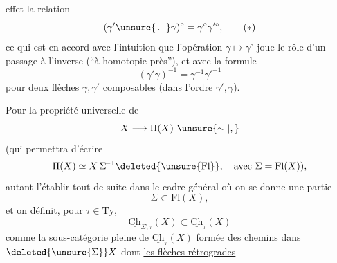 effet
la relation
\[(\gamma'\unsure{\,.\,|\,}\gamma)^\circ=\gamma^\circ\gamma'^\circ,\tag*{$(*)$}\]
ce qui est en accord avec l'intuition que l'opération $\gamma\longmapsto\gamma^\circ$ joue le rôle d'un passage à l'inverse (``à homotopie près''), et avec la formule
\[(\gamma'\gamma)^{-1}=\gamma^{-1}\gamma'^{-1}\]
pour deux flèches  $\gamma,\gamma'$ composables (dans l'ordre $\gamma',\gamma$).

Pour la propriété universelle de
\[X\longrightarrow\Pi(X)\ \unsure{\sim|,}\]
(qui permettra d'écrire
\[\Pi(X)\simeq X\,\Sigma^{\!-1}\deleted{\unsure{\mathrm{Fl}}},\quad\text{avec }\Sigma=\mathrm{Fl}(X)),\]
autant l'établir tout de suite dans le cadre général où on se donne une partie
\[\Sigma\subset\mathrm{Fl}(X),\]
et on définit, pour $\tau\in\mathrm{Ty}$,
\[\underline{\mathrm{Ch}}_{\Sigma,\tau}(X)\subset\underline{\mathrm{Ch}}_\tau(X)\]
comme la sous-catégorie pleine de $\underline{\mathrm{Ch}}_\tau(X)$ formée des chemins dans $\deleted{\unsure{\Sigma}}X$ dont \uline{ les flèches rétrogrades}
